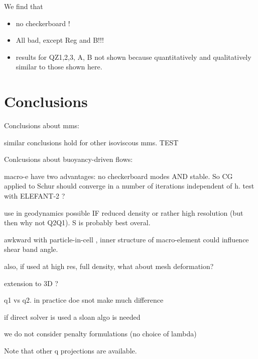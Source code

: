 \documentclass[a4paper]{article}
\begin{document}
We find that
\begin{itemize}
\item no checkerboard ! 
\item All bad, except Reg and B!!!
\item results for QZ1,2,3, A, B not shown because quantitatively and qualitatively similar to those shown here.
\end{itemize}








\section{Conclusions}\label{sec5}

Conclusions about mms:

similar conclusions hold for other isoviscous mms. TEST




Conlcusions about buoyancy-driven flows:

macro-e have two advantages: no checkerboard modes AND stable. So CG applied to Schur should converge in a number of iterations independent of h. test with ELEFANT-2 ?

use in geodynamics possible IF reduced density or rather high resolution (but then why not Q2Q1). S is probably best overal.

awkward with particle-in-cell , inner structure of macro-element could influence shear band angle. 

also, if used at high res, full density, what about mesh deformation?

extension to 3D ?

q1 vs q2. in practice doe snot make much difference

if direct solver is used a sloan algo is needed

we do not consider penalty formulations (no choice of lambda)

Note that other q projections are available.

\printbibliography
\end{document}
